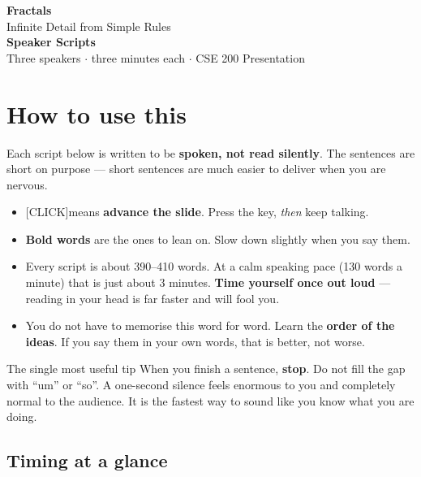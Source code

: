 \documentclass[12pt,a4paper]{article}
\newcommand{\cue}{\textcolor{RayColor}{\textsf{\footnotesize[CLICK]}}\hspace{0.3em}}
\newcommand{\stress}[1]{\textbf{#1}}
\begin{document}
\begin{center}
  {\Huge\bfseries\color{PrimaryColor} Fractals}\\[6pt]
  {\large\color{SecondaryColor} Infinite Detail from Simple Rules}\\[14pt]
  {\Large\bfseries Speaker Scripts}\\[6pt]
  {\color{DarkGray} Three speakers $\cdot$ three minutes each $\cdot$ CSE 200 Presentation}
\end{center}

\vspace{0.6cm}

\section*{How to use this}

Each script below is written to be \stress{spoken, not read silently}. The
sentences are short on purpose --- short sentences are much easier to deliver
when you are nervous.

\begin{itemize}[leftmargin=1.2em, itemsep=3pt]
  \item \cue means \stress{advance the slide}. Press the key, \emph{then} keep talking.
  \item \stress{Bold words} are the ones to lean on. Slow down slightly when you say them.
  \item Every script is about 390--410 words. At a calm speaking pace
        (\raisebox{0pt}{$\sim$}130 words a minute) that is just about 3 minutes.
        \stress{Time yourself once out loud} --- reading in your head is far faster
        and will fool you.
  \item You do not have to memorise this word for word. Learn the \stress{order of
        the ideas}. If you say them in your own words, that is better, not worse.
\end{itemize}

\begin{notebox}{The single most useful tip}
  When you finish a sentence, \stress{stop}. Do not fill the gap with ``um'' or
  ``so''. A one-second silence feels enormous to you and completely normal to the
  audience. It is the fastest way to sound like you know what you are doing.
\end{notebox}

\subsection*{Timing at a glance}
\end{document}
